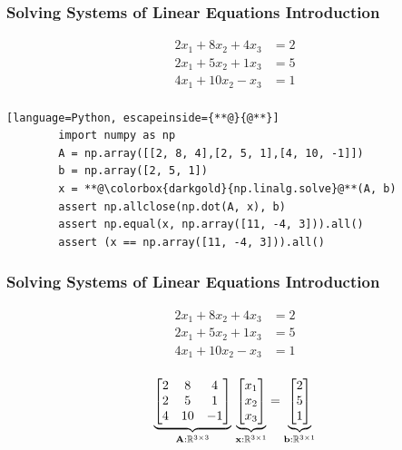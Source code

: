 \documentclass[12pt]{beamer}
\newcommand{\FrameTitle}[2]{\frametitle{#1 \hfill \small\textnormal{\textcolor{midgray}{#2}}}}
\begin{document}
\begin{frame}[fragile]\FrameTitle{Solving Systems of Linear Equations}{Introduction}
    \vspace*{-2em}
    \begin{align*}
        2x_1 + 8x_2 + 4x_3  &= 2 \\
        2x_1 + 5x_2 + 1x_3  &= 5 \\
        4x_1 + 10x_2 - x_3  &= 1 \\
    \end{align*}
    \vspace*{-1.5em}
    \begin{lstlisting}[language=Python, escapeinside={**@}{@**}]
        import numpy as np
        A = np.array([[2, 8, 4],[2, 5, 1],[4, 10, -1]])
        b = np.array([2, 5, 1])
        x = **@\colorbox{darkgold}{np.linalg.solve}@**(A, b)
        assert np.allclose(np.dot(A, x), b)
        assert np.equal(x, np.array([11, -4, 3])).all()
        assert (x == np.array([11, -4, 3])).all()\end{lstlisting}
    \hfill
\end{frame}

\begin{frame}\FrameTitle{Solving Systems of Linear Equations}{Introduction}
    \vspace*{-2em}
    \begin{align*}
        2x_1 + 8x_2 + 4x_3  &= 2 \\
        2x_1 + 5x_2 + 1x_3  &= 5 \\
        4x_1 + 10x_2 - x_3  &= 1 \\
    \end{align*}

    \vspace*{-1.5em}
    \[
        \underbrace{
            \begin{bmatrix}
                2 & 8 & 4 \\
                2 & 5 & 1 \\
                4 & 10 & -1
            \end{bmatrix}
        }_{\mathbf{A}:\mathbb{R}^{3 \times 3}}
        \,
        \underbrace{
            \begin{bmatrix}
                x_1 \\
                x_2 \\
                x_3
            \end{bmatrix}
        }_{\textbf{x}: \mathbb{R}^{3 \times 1}}
        =
        \underbrace{
            \begin{bmatrix}
                2 \\
                5 \\
                1
            \end{bmatrix}
        }_{\textrm{\textbf{b}}: \mathbb{R}^{3 \times 1}}
    \]
\end{frame}
\end{document}
